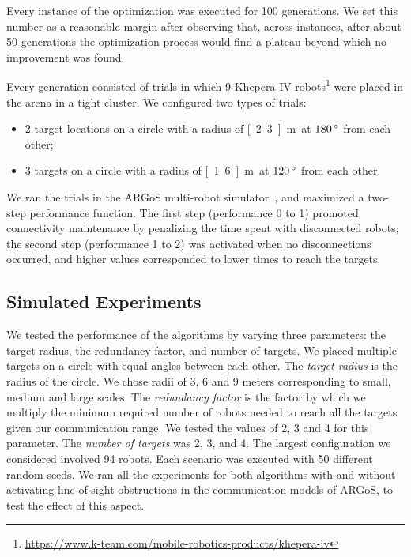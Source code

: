 Every instance of the optimization was executed for 100
generations. We set this number as a reasonable margin after observing
that, across instances, after about 50 generations the optimization
process would find a plateau beyond which no improvement was found.

Every generation consisted of trials in which 9 Khepera IV
robots\footnote{\url{https://www.k-team.com/mobile-robotics-products/khepera-iv}}
were placed in the arena in a tight cluster. We configured two types
of trials:
\begin{itemize}
\item 2 target locations on a circle with a radius of \unit[2.3]{m} at
  $\unit[180]{^\circ}$ from each other;
\item 3 targets on a circle with a radius of \unit[1.6]{m} at
  $\unit[120]{^\circ}$ from each other.
\end{itemize}

We ran the trials in the ARGoS multi-robot
simulator~\cite{Pinciroli2012}, and maximized a two-step performance
function. The first step (performance 0 to 1) promoted connectivity
maintenance by penalizing the time spent with disconnected robots; the
second step (performance 1 to 2) was activated when no disconnections
occurred, and higher values corresponded to lower times to reach the
targets.

\subsection{Simulated Experiments}
\label{sec:simexperiments}

We tested the performance of the algorithms by varying three
parameters: the target radius, the redundancy factor, and number of
targets. We placed multiple targets on a circle with equal angles
between each other. The \emph{target radius} is the radius of the
circle. We chose radii of 3, 6 and 9 meters corresponding to small,
medium and large scales. The \emph{redundancy factor} is the factor by
which we multiply the minimum required number of robots needed to
reach all the targets given our communication range. We tested the
values of 2, 3 and 4 for this parameter. The \emph{number of targets}
was 2, 3, and 4. The largest configuration we considered involved 94
robots. Each scenario was executed with 50 different random seeds. We
ran all the experiments for both algorithms with and without
activating line-of-sight obstructions in the communication models of
ARGoS, to test the effect of this aspect.

